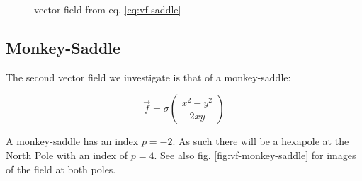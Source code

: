\documentclass[a4paper,10pt,notitlepage]{scrartcl}
\begin{document}
\begin{figure}[H]
  \centering
  \caption{vector field from eq. \ref{eq:vf-saddle}}
  \label{fig:vf-saddle}
\end{figure}

\subsection{Monkey-Saddle}

The second vector field we investigate is that of a monkey-saddle:

\begin{equation}
 \vec{f} = \sigma \left( \begin{array}{c}
                   x^2-y^2 \\ -2xy
                  \end{array} \right)
 \label{eq:vf-monkey-saddle}
\end{equation}

A monkey-saddle has an index $p = -2$. As such there will be a hexapole at
the North Pole with an index of $p = 4$. See also fig.
\ref{fig:vf-monkey-saddle} for images of the field at both poles.
\end{document}
